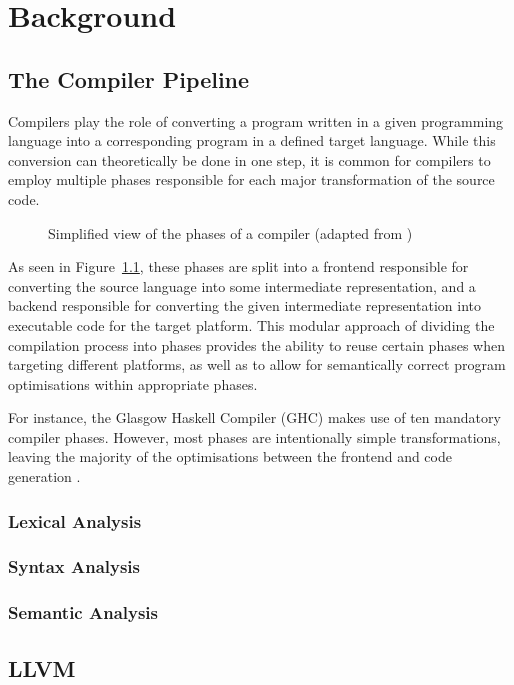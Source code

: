 \chapter{Background}

\section{The Compiler Pipeline}

Compilers play the role of converting a program written in a given programming language into a
corresponding program in a defined target language. While this conversion can theoretically be done
in one step, it is common for compilers to employ multiple phases responsible for each major
transformation of the source code. \autocite{grune2012modern}

\begin{figure}
    \centering
    
    \caption{Simplified view of the phases of a compiler (adapted from \autocite{grune2012modern})}
    \label{fig:compiler-pipeline}
\end{figure}

As seen in Figure~\ref{fig:compiler-pipeline}, these phases are split into a frontend responsible
for converting the source language into some intermediate representation, and a backend responsible
for converting the given intermediate representation into executable code for the target platform.
This modular approach of dividing the compilation process into phases provides the ability to reuse
certain phases when targeting different platforms, as well as to allow for semantically correct
program optimisations within appropriate phases.

For instance, the Glasgow Haskell Compiler (GHC) makes use of ten mandatory compiler phases.
However, most phases are intentionally simple transformations, leaving the majority of the
optimisations between the frontend and code generation \autocite{ghccompiler,
    jones1997transformation}.

\subsection{Lexical Analysis}

\subsection{Syntax Analysis}

\subsection{Semantic Analysis}

\section{LLVM}

